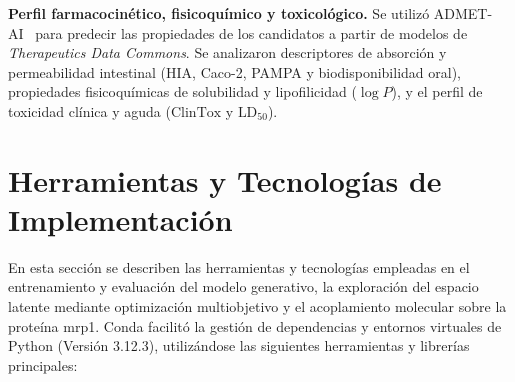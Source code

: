\textbf{Perfil farmacocinético, fisicoquímico y toxicológico.} Se utilizó ADMET-AI~\cite{swanson2024admetai} para predecir las propiedades de los candidatos a partir de modelos de \textit{Therapeutics Data Commons}. Se analizaron descriptores de absorción y permeabilidad intestinal (HIA, Caco-2, PAMPA y biodisponibilidad oral), propiedades fisicoquímicas de solubilidad y lipofilicidad ($\log P$), y el perfil de toxicidad clínica y aguda ($\text{ClinTox}$ y $\text{LD}_{50}$).

\section{Herramientas y Tecnologías de Implementación}
\label{sec:herramientas_tecnologias}

En esta sección se describen las herramientas y tecnologías empleadas en el entrenamiento y evaluación del modelo generativo, la exploración del espacio latente mediante optimización multiobjetivo y el acoplamiento molecular sobre la proteína \gls{mrp1}. Conda facilitó la gestión de dependencias y entornos virtuales de Python (Versión 3.12.3), utilizándose las siguientes herramientas y librerías principales:

